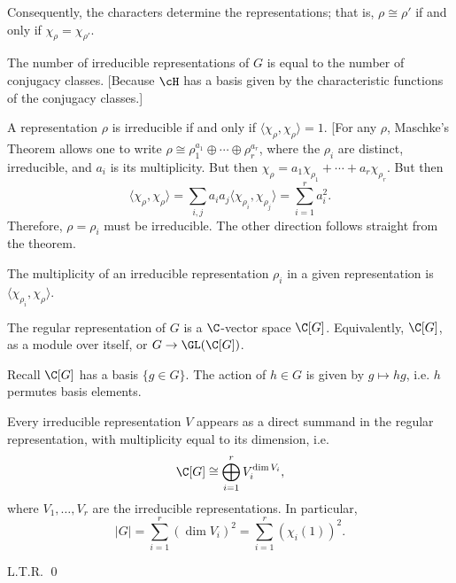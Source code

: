 \newpage







Consequently, the characters determine the representations; that is, $\rho \cong \rho'$ if and only if $\chi_\rho = \chi_{\rho'}$. 


The number of irreducible representations of $G$ is equal to the number of conjugacy classes. [Because $\cH$ has a basis given by the characteristic functions of the conjugacy classes.]


A representation $\rho$ is irreducible if and only if $\langle \chi_\rho,\chi_\rho\rangle=1$. [For any $\rho$, Maschke's Theorem allows one to write $\rho \cong \rho_1^{a_1} \oplus \cdots \oplus \rho_r^{a_r}$, where the $\rho_i$ are distinct, irreducible, and $a_i$ is its multiplicity. But then $\chi_\rho= a_1\chi_{\rho_1} + \cdots + a_r \chi_{\rho_r}$. But then 
	\[
	\langle \chi_\rho, \chi_\rho \rangle = \sum_{i,j} a_i a_j \langle \chi_{\rho_i}, \chi_{\rho_j} \rangle= \sum_{i=1}^r a_i^2.
	\]
Therefore, $\rho=\rho_i$ must be irreducible. The other direction follows straight from the theorem.


The multiplicity of an irreducible representation $\rho_i$ in a given representation is $\langle \chi_{\rho_i}, \chi_\rho \rangle$. %






\begin{dfn}
The regular representation of $G$ is a $\C$-vector space $\C[G]$. Equivalently, $\C[G]$, as a module over itself, or $G \to \GL(\C[G])$.
\end{dfn}


Recall $\C[G]$ has a basis $\{g \in G\}$. The action of $h \in G$ is given by $g \mapsto hg$, i.e. $h$ permutes basis elements. 


\begin{prop}
Every irreducible representation $V$ appears as a direct summand in the regular representation, with multiplicity equal to its dimension, i.e.
	\[
	\C[G] \cong \bigoplus_{i=1}^r V_i^{\dim V_i},
	\]
where $V_1,\ldots, V_r$ are the irreducible representations. In particular, 
	\[
	|G|= \sum_{i=1}^r (\dim V_i)^2= \sum_{i=1}^r (\chi_i(1))^2.
	\]
\end{prop}

\pf L.T.R. \qed \\






